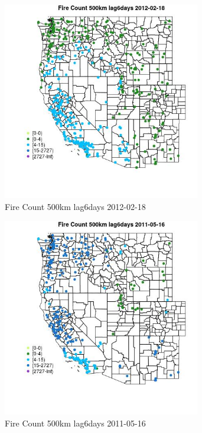 \begin{figure} 
\centering  
\includegraphics[width=0.77\textwidth]{Code_Outputs/Report_ML_input_PM25_Step4_part_f_de_duplicated_aves_prioritize_24hr_obswNAs_MapObsFire_Count_500km_lag6days2012-02-18.jpg} 
\caption{\label{fig:Report_ML_input_PM25_Step4_part_f_de_duplicated_aves_prioritize_24hr_obswNAsMapObsFire_Count_500km_lag6days2012-02-18}Fire Count 500km lag6days 2012-02-18} 
\end{figure} 
 

\begin{figure} 
\centering  
\includegraphics[width=0.77\textwidth]{Code_Outputs/Report_ML_input_PM25_Step4_part_f_de_duplicated_aves_prioritize_24hr_obswNAs_MapObsFire_Count_500km_lag6days2011-05-16.jpg} 
\caption{\label{fig:Report_ML_input_PM25_Step4_part_f_de_duplicated_aves_prioritize_24hr_obswNAsMapObsFire_Count_500km_lag6days2011-05-16}Fire Count 500km lag6days 2011-05-16} 
\end{figure} 
 

